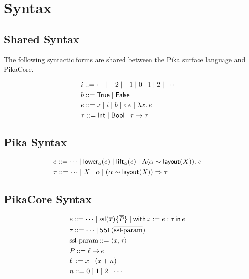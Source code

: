 \section{Syntax}

\subsection{Shared Syntax}

The following syntactic forms are shared between the Pika surface language and PikaCore.

\begin{align*}
  &i ::= \cdots \mid -2 \mid -1 \mid 0 \mid 1 \mid 2 \mid \cdots
  \\
  &b ::= \textsf{True}{} \mid \textsf{False}
  \\
  &e ::= x \mid i \mid b \mid e\; e \mid \lambda x.\; e
  \\
  &\tau ::= \textsf{Int} \mid \textsf{Bool} \mid \tau \rightarrow \tau
\end{align*}

\subsection{Pika Syntax}
\begin{align*}
  &e ::= \cdots \mid \textsf{lower}_{\alpha}(e) \mid \textsf{lift}_{\alpha}(e) \mid \Lambda (\alpha \sim \textsf{layout}(X)).\; e
  \\
  &\tau ::= \cdots \mid X \mid \alpha \mid (\alpha \sim \textsf{layout}(X)) \Rightarrow \tau
\end{align*}

\subsection{PikaCore Syntax}
\begin{align*}
  &e ::= \cdots \mid \textsf{ssl}(\overline{x}) \{ \overline{P} \} \mid \textsf{with}\,x := e : \tau\,\textsf{in}\, e
  \\
  &\tau ::= \cdots \mid \textsf{SSL}(\overline{\textnormal{ssl-param}})
  \\
  &\textnormal{ssl-param} ::= \langle x, \tau \rangle
  \\
  &P ::= \ell \mapsto e
  \\
  &\ell ::= x \mid (x + n)
  \\
  &n ::= 0 \mid 1 \mid 2 \mid \cdots
\end{align*}


